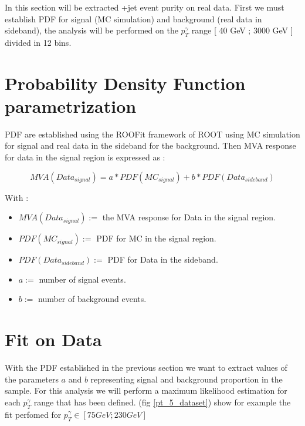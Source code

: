 \label{sec:unchapitre}

In this section will be extracted \textgamma+jet event purity on real data.
First we must establish PDF for signal (MC simulation) and background (real data in sideband), the analysis will be
performed on the $p_T^\gamma$ range [ 40 GeV ; 3000 GeV ] divided in 12 bins.

\section{Probability Density Function parametrization}

PDF are established using the ROOFit framework of ROOT using MC simulation for signal and real data in the sideband for the background.
Then MVA response for data in the signal region is expressed as : 

\begin{equation}
MVA(Data_{signal}) = a*PDF(MC_{signal}) + b*PDF(Data_{sideband})
\end{equation}

With : 
\begin{itemize}
	\item $MVA(Data_{signal}) :=$ the MVA response for Data in the signal region.
	\item $PDF(MC_{signal}) :=$ PDF for MC in the signal region.
	\item $PDF(Data_{sideband}) :=$ PDF for Data in the sideband. 
	\item $a :=$ number of signal events.
	\item $b :=$ number of background events. 
\end{itemize}


\section{Fit on Data}

With the PDF established in the previous section we want to extract values of the parameters $a$ and $b$ representing
signal and background proportion in the sample. For this analysis we will perform a maximum likelihood estimation for
each $p_T^\gamma$ range that has been defined. (fig \ref{pt_5_dataset}) show for example the fit perfomed for
$p_T^\gamma \in [ 75 GeV ; 230 GeV ]$

